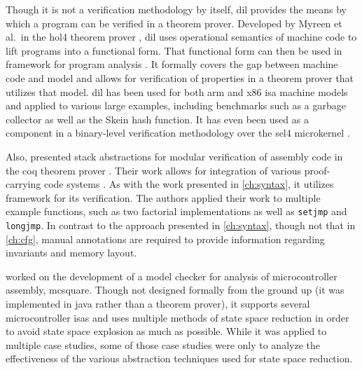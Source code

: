 Though it is not a verification methodology by itself,
\gls{dil} provides the means by which a program can be verified in a theorem prover.
Developed by Myreen et al.\ in the \gls{hol4} theorem prover \autocite{slind2008brief},
\gls{dil} uses operational semantics of machine code
to lift programs into a functional form.
That functional form can then be used in  framework
for program analysis \autocite{myreen2007hoare}.
It formally covers the gap between machine code and  model
and allows for verification of properties in a theorem prover that utilizes that model.
\Gls{dil} has been used for both \gls{arm} and \gls{x86} \gls{isa} machine models
and applied to various large examples,
including benchmarks such as a garbage collector as well as the Skein hash function.
It has even been used as a component in a binary-level verification methodology
over the \gls{sel4} microkernel \autocite{sewell2013tvv}.

Also, \textcite{feng2006modular,feng2005sbca} presented stack abstractions
for modular verification of assembly code
in the \gls{coq} theorem prover \autocite{chlipala2013certified}.
Their work allows for integration
of various proof-carrying code systems \autocite{necula1997proof}.
As with the work presented in \cref{ch:syntax},
it utilizes  framework for its verification.
The authors applied their work to multiple example functions,
such as two factorial implementations
as well as \lstinline|setjmp| and \lstinline|longjmp|.
In contrast to the approach presented in \cref{ch:syntax},
though not that in \cref{ch:cfg},
manual annotations are required to provide information
regarding invariants and memory layout.

\Textcite{schlich2008phd} worked on the development of a model checker for analysis
of microcontroller assembly, \gls{mcsquare}.
Though not designed formally from the ground up (it was implemented in \gls{java} rather than a theorem prover), it supports several microcontroller \glspl{isa} and uses multiple methods of state space reduction in order to avoid state space explosion as much as possible.
While it was applied to multiple case studies,
some of those case studies were only to analyze the effectiveness
of the various abstraction techniques used for state space reduction.

